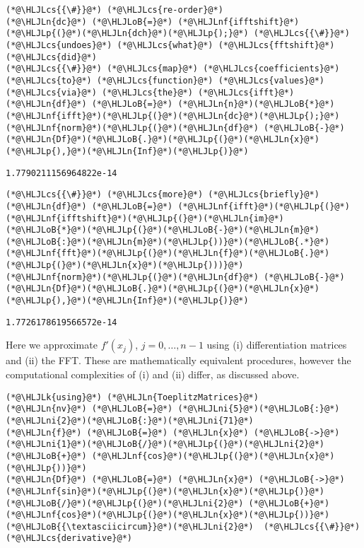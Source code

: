 \documentclass[12pt,landscape]{article}
\newcommand{\HLJLk}[1]{\textcolor[RGB]{148,91,176}{\textbf{#1}}}
\newcommand{\HLJLn}[1]{#1}
\newcommand{\HLJLnf}[1]{\textcolor[RGB]{66,102,213}{#1}}
\newcommand{\HLJLni}[1]{\textcolor[RGB]{59,151,46}{#1}}
\newcommand{\HLJLoB}[1]{\textcolor[RGB]{102,102,102}{\textbf{#1}}}
\newcommand{\HLJLp}[1]{#1}
\newcommand{\HLJLcs}[1]{\textcolor[RGB]{153,153,119}{\textit{#1}}}
\begin{document}
{\begin{lstlisting}
(*@\HLJLcs{{\#}}@*) (*@\HLJLcs{re-order}@*)
(*@\HLJLn{dc}@*) (*@\HLJLoB{=}@*) (*@\HLJLnf{ifftshift}@*)(*@\HLJLp{(}@*)(*@\HLJLn{dch}@*)(*@\HLJLp{);}@*) (*@\HLJLcs{{\#}}@*) (*@\HLJLcs{undoes}@*) (*@\HLJLcs{what}@*) (*@\HLJLcs{fftshift}@*) (*@\HLJLcs{did}@*)
(*@\HLJLcs{{\#}}@*) (*@\HLJLcs{map}@*) (*@\HLJLcs{coefficients}@*) (*@\HLJLcs{to}@*) (*@\HLJLcs{function}@*) (*@\HLJLcs{values}@*) (*@\HLJLcs{via}@*) (*@\HLJLcs{the}@*) (*@\HLJLcs{ifft}@*)
(*@\HLJLn{df}@*) (*@\HLJLoB{=}@*) (*@\HLJLn{n}@*)(*@\HLJLoB{*}@*)(*@\HLJLnf{ifft}@*)(*@\HLJLp{(}@*)(*@\HLJLn{dc}@*)(*@\HLJLp{);}@*)
(*@\HLJLnf{norm}@*)(*@\HLJLp{(}@*)(*@\HLJLn{df}@*) (*@\HLJLoB{-}@*) (*@\HLJLn{Df}@*)(*@\HLJLoB{.}@*)(*@\HLJLp{(}@*)(*@\HLJLn{x}@*)(*@\HLJLp{),}@*)(*@\HLJLn{Inf}@*)(*@\HLJLp{)}@*)
\end{lstlisting}

\begin{lstlisting}
1.7790211156964822e-14
\end{lstlisting}


\begin{lstlisting}
(*@\HLJLcs{{\#}}@*) (*@\HLJLcs{more}@*) (*@\HLJLcs{briefly}@*)
(*@\HLJLn{df}@*) (*@\HLJLoB{=}@*) (*@\HLJLnf{ifft}@*)(*@\HLJLp{(}@*)(*@\HLJLnf{ifftshift}@*)(*@\HLJLp{(}@*)(*@\HLJLn{im}@*)(*@\HLJLoB{*}@*)(*@\HLJLp{(}@*)(*@\HLJLoB{-}@*)(*@\HLJLn{m}@*)(*@\HLJLoB{:}@*)(*@\HLJLn{m}@*)(*@\HLJLp{))}@*)(*@\HLJLoB{.*}@*)(*@\HLJLnf{fft}@*)(*@\HLJLp{(}@*)(*@\HLJLn{f}@*)(*@\HLJLoB{.}@*)(*@\HLJLp{(}@*)(*@\HLJLn{x}@*)(*@\HLJLp{)))}@*)
(*@\HLJLnf{norm}@*)(*@\HLJLp{(}@*)(*@\HLJLn{df}@*) (*@\HLJLoB{-}@*) (*@\HLJLn{Df}@*)(*@\HLJLoB{.}@*)(*@\HLJLp{(}@*)(*@\HLJLn{x}@*)(*@\HLJLp{),}@*)(*@\HLJLn{Inf}@*)(*@\HLJLp{)}@*)
\end{lstlisting}

\begin{lstlisting}
1.7726178619566572e-14
\end{lstlisting}


Here we approximate $f'(x_j)$, $j = 0, \ldots, n-1$ using (i) differentiation matrices and (ii) the FFT.  These are mathematically equivalent procedures, however the computational complexities of (i) and (ii) differ, as discussed above.


\begin{lstlisting}
(*@\HLJLk{using}@*) (*@\HLJLn{ToeplitzMatrices}@*)
(*@\HLJLn{nv}@*) (*@\HLJLoB{=}@*) (*@\HLJLni{5}@*)(*@\HLJLoB{:}@*)(*@\HLJLni{2}@*)(*@\HLJLoB{:}@*)(*@\HLJLni{71}@*)
(*@\HLJLn{f}@*) (*@\HLJLoB{=}@*) (*@\HLJLn{x}@*) (*@\HLJLoB{->}@*) (*@\HLJLni{1}@*)(*@\HLJLoB{/}@*)(*@\HLJLp{(}@*)(*@\HLJLni{2}@*) (*@\HLJLoB{+}@*) (*@\HLJLnf{cos}@*)(*@\HLJLp{(}@*)(*@\HLJLn{x}@*)(*@\HLJLp{))}@*)
(*@\HLJLn{Df}@*) (*@\HLJLoB{=}@*) (*@\HLJLn{x}@*) (*@\HLJLoB{->}@*) (*@\HLJLnf{sin}@*)(*@\HLJLp{(}@*)(*@\HLJLn{x}@*)(*@\HLJLp{)}@*)(*@\HLJLoB{/}@*)(*@\HLJLp{(}@*)(*@\HLJLni{2}@*) (*@\HLJLoB{+}@*) (*@\HLJLnf{cos}@*)(*@\HLJLp{(}@*)(*@\HLJLn{x}@*)(*@\HLJLp{))}@*)(*@\HLJLoB{{\textasciicircum}}@*)(*@\HLJLni{2}@*)  (*@\HLJLcs{{\#}}@*) (*@\HLJLcs{derivative}@*)


\end{lstlisting}}
\end{document}
